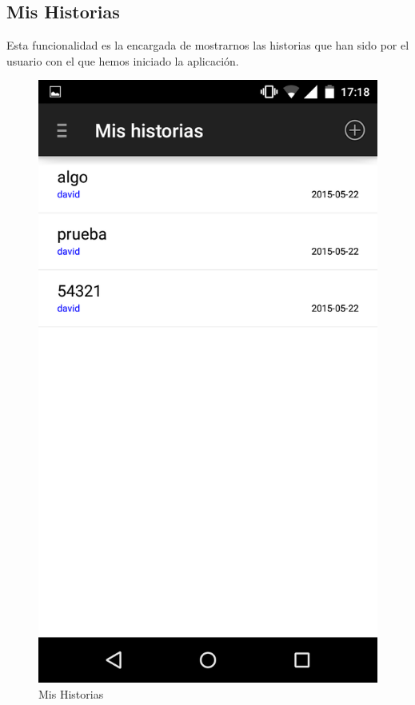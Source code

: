 \documentclass[11pt,a4paper, titlepage]{article}
\begin{document}
	\FloatBarrier
	\subsection[Mis Historias]{Mis Historias}
	Esta funcionalidad es la encargada de mostrarnos las historias que han sido por el usuario con el que hemos iniciado la aplicación.
	
	\begin{figure}[hbtp]
		\centering
		\includegraphics[scale = 0.25 ]{img/5}
		\caption{Mis Historias}
		\label{p12}
	\end{figure}
	
\end{document}
